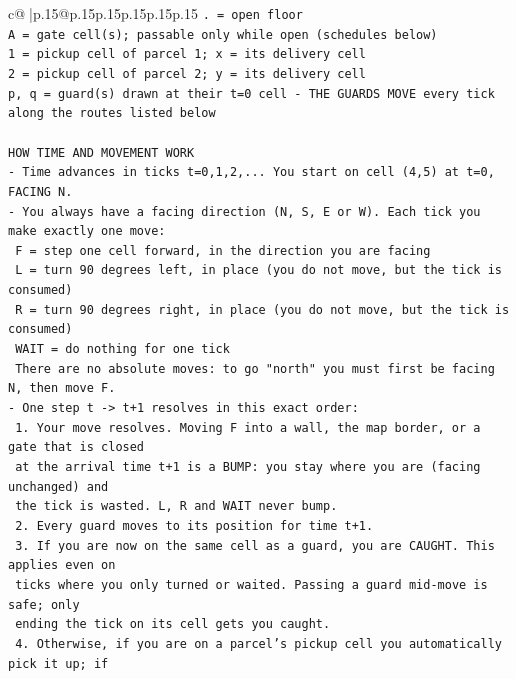 \documentclass{article}
\begin{document}
{\begin{supertabular}{c@{$\;$}|p{.15\linewidth}@{}p{.15\linewidth}p{.15\linewidth}p{.15\linewidth}p{.15\linewidth}p{.15\linewidth}}
{{{\texttt{. = open floor} \\
\texttt{A = gate cell(s); passable only while open (schedules below)} \\
\texttt{1 = pickup cell of parcel 1; x = its delivery cell} \\
\texttt{2 = pickup cell of parcel 2; y = its delivery cell} \\
\texttt{p, q = guard(s) drawn at their t=0 cell {-} THE GUARDS MOVE every tick along the routes listed below} \\
\\ 
\texttt{HOW TIME AND MOVEMENT WORK} \\
\texttt{{-} Time advances in ticks t=0,1,2,... You start on cell (4,5) at t=0, FACING N.} \\
\texttt{{-} You always have a facing direction (N, S, E or W). Each tick you make exactly one move:} \\
\texttt{  F    = step one cell forward, in the direction you are facing} \\
\texttt{  L    = turn 90 degrees left, in place (you do not move, but the tick is consumed)} \\
\texttt{  R    = turn 90 degrees right, in place (you do not move, but the tick is consumed)} \\
\texttt{  WAIT = do nothing for one tick} \\
\texttt{  There are no absolute moves: to go "north" you must first be facing N, then move F.} \\
\texttt{{-} One step t {-}> t+1 resolves in this exact order:} \\
\texttt{  1. Your move resolves. Moving F into a wall, the map border, or a gate that is closed} \\
\texttt{     at the arrival time t+1 is a BUMP: you stay where you are (facing unchanged) and} \\
\texttt{     the tick is wasted. L, R and WAIT never bump.} \\
\texttt{  2. Every guard moves to its position for time t+1.} \\
\texttt{  3. If you are now on the same cell as a guard, you are CAUGHT. This applies even on} \\
\texttt{     ticks where you only turned or waited. Passing a guard mid{-}move is safe; only} \\
\texttt{     ending the tick on its cell gets you caught.} \\
\texttt{  4. Otherwise, if you are on a parcel's pickup cell you automatically pick it up; if} \\
}}}
\end{supertabular}}
\end{document}

